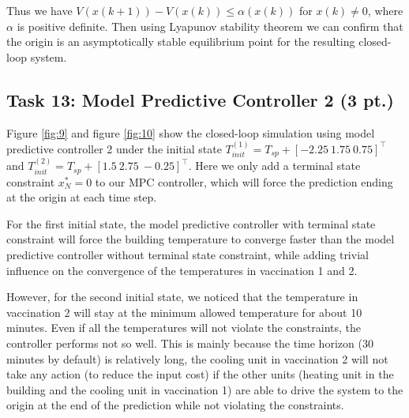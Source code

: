 \documentclass[a4paper,twoside,11pt]{article}
\numberwithin{equation}{section}
\begin{document}
Thus we have $V(x(k+1))- V(x(k)) \le \alpha(x(k))$ for $x(k) \neq 0$, where $\alpha$ is positive definite. Then using Lyapunov stability theorem we can confirm that the origin is an asymptotically stable equilibrium point for the resulting closed-loop system. 

\subsection{Task 13: Model Predictive Controller 2 (3 pt.)}

Figure \ref{fig:9} and figure \ref{fig:10} show the closed-loop simulation using model predictive controller 2 under the initial state $T^{(1)}_{init} = T_{sp} + [-2.25 \ 1.75 \ 0.75]^\top$ and $T^{(2)}_{init} = T_{sp} + [1.5 \ 2.75 \ -0.25]^\top$. Here we only add a terminal state constraint $x^*_N = 0$ to our MPC controller, which will force the prediction ending at the origin at each time step. 

For the first initial state, the model predictive controller with terminal state constraint will force the building temperature to converge faster than the model predictive controller without terminal state constraint, while adding trivial influence on the convergence of the temperatures in vaccination 1 and 2. 

However, for the second initial state, we noticed that the temperature in vaccination 2 will stay at the minimum allowed temperature for about 10 minutes. Even if all the temperatures will not violate the constraints, the controller performs not so well. This is mainly because the time horizon (30 minutes by default) is relatively long, the cooling unit in vaccination 2 will not take any action (to reduce the input cost) if the other units (heating unit in the building and the cooling unit in vaccination 1) are able to drive the system to the origin at the end of the prediction while not violating the constraints. 

\newpage
\end{document}

